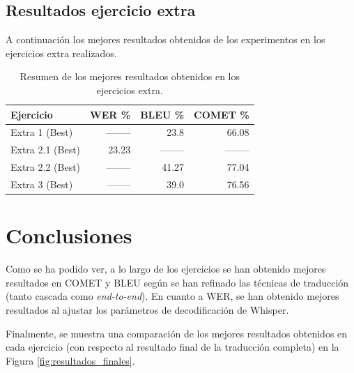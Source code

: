 \documentclass[11pt,spanish,listoffigures,listoftables]{tfgetsinf}
\begin{document}
\section{Resultados ejercicio extra}
A continuación los mejores resultados obtenidos de los experimentos en los ejercicios extra realizados.
\begin{table}[H]
\centering
\begin{tabular}{lrrr}
	\toprule
	\textbf{Ejercicio} & \textbf{WER \%} & \textbf{BLEU \%} & \textbf{COMET \%} \\
	\midrule
	Extra 1 (Best) & -------- & 23.8 & 66.08 \\
	Extra 2.1 (Best) & 23.23 & -------- & -------- \\
	Extra 2.2 (Best) & -------- & 41.27 & 77.04 \\
	Extra 3 (Best) & -------- & 39.0 & 76.56 \\
	\bottomrule
\end{tabular}
\caption{Resumen de los mejores resultados obtenidos en los ejercicios extra.}
\label{tab:wer_commet_blue_extra}
\end{table}

\chapter{Conclusiones}
Como se ha podido ver, a lo largo de los ejercicios se han obtenido mejores resultados en COMET y BLEU según se han refinado las técnicas de traducción (tanto cascada como \textit{end-to-end}). En cuanto a WER, se han obtenido mejores resultados al ajustar los parámetros de decodificación de Whisper. 

Finalmente, se muestra una comparación de los mejores resultados obtenidos en cada ejercicio (con respecto al resultado final de la traducción completa) en la Figura \ref{fig:resultados_finales}.
\end{document}
